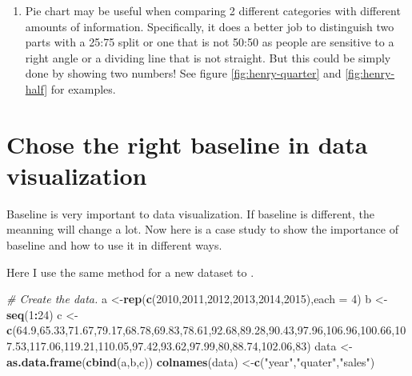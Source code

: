 \documentclass[]{book}
\newenvironment{Shaded}{\begin{snugshade}}{\end{snugshade}}
\newcommand{\KeywordTok}[1]{\textcolor[rgb]{0.13,0.29,0.53}{\textbf{#1}}}
\newcommand{\DataTypeTok}[1]{\textcolor[rgb]{0.13,0.29,0.53}{#1}}
\newcommand{\DecValTok}[1]{\textcolor[rgb]{0.00,0.00,0.81}{#1}}
\newcommand{\FloatTok}[1]{\textcolor[rgb]{0.00,0.00,0.81}{#1}}
\newcommand{\StringTok}[1]{\textcolor[rgb]{0.31,0.60,0.02}{#1}}
\newcommand{\CommentTok}[1]{\textcolor[rgb]{0.56,0.35,0.01}{\textit{#1}}}
\newcommand{\OperatorTok}[1]{\textcolor[rgb]{0.81,0.36,0.00}{\textbf{#1}}}
\newcommand{\NormalTok}[1]{#1}
\providecommand{\tightlist}{%
  \setlength{\itemsep}{0pt}\setlength{\parskip}{0pt}}
\theoremstyle{definition}
\theoremstyle{definition}
\theoremstyle{definition}
\theoremstyle{remark}
\begin{document}
\begin{enumerate}
\def\labelenumi{\arabic{enumi}.}
\setcounter{enumi}{3}
\tightlist
\item
  Pie chart may be useful when comparing 2 different categories with
  different amounts of information. Specifically, it does a better job
  to distinguish two parts with a 25:75 split or one that is not 50:50
  as people are sensitive to a right angle or a dividing line that is
  not straight. But this could be simply done by showing two numbers!
  See figure \ref{fig:henry-quarter} and \ref{fig:henry-half} for
  examples.
\end{enumerate}

\section{Chose the right baseline in data
visualization}\label{chose-the-right-baseline-in-data-visualization}

Baseline is very important to data visualization. If baseline is
different, the meanning will change a lot. Now here is a case study to
show the importance of baseline and how to use it in different ways.

Here I use the same method for a new dataset to .

\begin{Shaded}
\begin{Highlighting}[]
\CommentTok{# Create the data.}
\NormalTok{a <-}\KeywordTok{rep}\NormalTok{(}\KeywordTok{c}\NormalTok{(}\DecValTok{2010}\NormalTok{,}\DecValTok{2011}\NormalTok{,}\DecValTok{2012}\NormalTok{,}\DecValTok{2013}\NormalTok{,}\DecValTok{2014}\NormalTok{,}\DecValTok{2015}\NormalTok{),}\DataTypeTok{each =} \DecValTok{4}\NormalTok{)}
\NormalTok{b <-}\StringTok{ }\KeywordTok{seq}\NormalTok{(}\DecValTok{1}\OperatorTok{:}\DecValTok{24}\NormalTok{)}
\NormalTok{c <-}\StringTok{ }\KeywordTok{c}\NormalTok{(}\FloatTok{64.9}\NormalTok{,}\FloatTok{65.33}\NormalTok{,}\FloatTok{71.67}\NormalTok{,}\FloatTok{79.17}\NormalTok{,}\FloatTok{68.78}\NormalTok{,}\FloatTok{69.83}\NormalTok{,}\FloatTok{78.61}\NormalTok{,}\FloatTok{92.68}\NormalTok{,}\FloatTok{89.28}\NormalTok{,}\FloatTok{90.43}\NormalTok{,}\FloatTok{97.96}\NormalTok{,}\FloatTok{106.96}\NormalTok{,}\FloatTok{100.66}\NormalTok{,}\FloatTok{107.53}\NormalTok{,}\FloatTok{117.06}\NormalTok{,}\FloatTok{119.21}\NormalTok{,}\FloatTok{110.05}\NormalTok{,}\FloatTok{97.42}\NormalTok{,}\FloatTok{93.62}\NormalTok{,}\FloatTok{97.99}\NormalTok{,}\DecValTok{80}\NormalTok{,}\FloatTok{88.74}\NormalTok{,}\FloatTok{102.06}\NormalTok{,}\DecValTok{83}\NormalTok{)}
\NormalTok{data <-}\StringTok{ }\KeywordTok{as.data.frame}\NormalTok{(}\KeywordTok{cbind}\NormalTok{(a,b,c))}
\KeywordTok{colnames}\NormalTok{(data) <-}\KeywordTok{c}\NormalTok{(}\StringTok{"year"}\NormalTok{,}\StringTok{"quater"}\NormalTok{,}\StringTok{"sales"}\NormalTok{)}
\end{Highlighting}
\end{Shaded}
\end{document}
